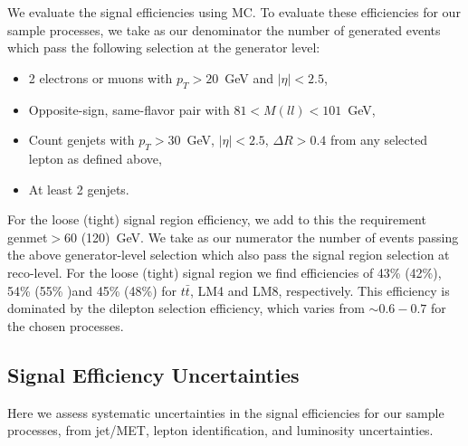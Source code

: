 We evaluate the signal efficiencies using MC. To evaluate these efficiencies for our sample processes, 
we take as our denominator the number of generated events which pass the following selection at
the generator level:

\begin{itemize}
\item 2 electrons or muons with $p_T>20$~GeV and $|\eta|<2.5$,
\item Opposite-sign, same-flavor pair with $81 < M(ll) < 101$~GeV,
\item Count genjets with $p_T > 30$~GeV, $|\eta|<2.5$, $\Delta R > 0.4$ from any selected lepton as defined above,
\item At least 2 genjets.
\end{itemize}

For the loose (tight) signal region efficiency, we add to this the requirement genmet$>60$ (120)~GeV.
We take as our numerator the number of events passing the above generator-level selection which
also pass the signal region selection at reco-level. 
For the loose (tight) signal region we find efficiencies of 43\% (42\%), 54\% (55\% )and 45\% (48\%) 
for $t\bar{t}$, LM4 and LM8, respectively.
This efficiency is dominated by the dilepton selection efficiency, which varies from $\sim0.6-0.7$ for the chosen 
processes. 





\subsection{Signal Efficiency Uncertainties}

Here we assess systematic uncertainties in the signal efficiencies for our sample processes, from
jet/MET, lepton identification, and luminosity uncertainties. 

